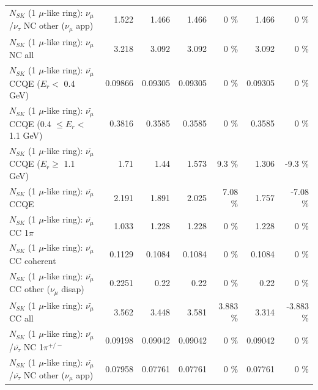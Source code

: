 \begin{table}
\begin{tabular}{| l | r | r | r  r | r  r |}
     $N_{SK}$ (1 $\mu$-like ring): $\nu_\mu$/$\nu_\tau$ NC other ($\nu_\mu$ app) &           1.522 &           1.466 &           1.466 &        0 \%  &           1.466 &        0 \%  \\ 
                                $N_{SK}$ (1 $\mu$-like ring): $\nu_{\mu}$ NC all &           3.218 &           3.092 &           3.092 &        0 \%  &           3.092 &        0 \%  \\ 
\hline
\hline
\hline
          $N_{SK}$ (1 $\mu$-like ring): $\bar{\nu_\mu}$ CCQE ($E_{r} <$ 0.4 GeV) &         0.09866 &         0.09305 &         0.09305 &        0 \%  &         0.09305 &        0 \%  \\ 
 $N_{SK}$ (1 $\mu$-like ring): $\bar{\nu_\mu}$ CCQE (0.4 $\leq E_{r} <$ 1.1 GeV) &          0.3816 &          0.3585 &          0.3585 &        0 \%  &          0.3585 &        0 \%  \\ 
       $N_{SK}$ (1 $\mu$-like ring): $\bar{\nu_\mu}$ CCQE ($E_{r} \geq$ 1.1 GeV) &            1.71 &            1.44 &           1.573 &      9.3 \%  &           1.306 &     -9.3 \%  \\ 
\hline
                              $N_{SK}$ (1 $\mu$-like ring): $\bar{\nu_\mu}$ CCQE &           2.191 &           1.891 &           2.025 &     7.08 \%  &           1.757 &    -7.08 \%  \\ 
                         $N_{SK}$ (1 $\mu$-like ring): $\bar{\nu_\mu}$ CC 1$\pi$ &           1.033 &           1.228 &           1.228 &        0 \%  &           1.228 &        0 \%  \\ 
                       $N_{SK}$ (1 $\mu$-like ring): $\bar{\nu_\mu}$ CC coherent &          0.1129 &          0.1084 &          0.1084 &        0 \%  &          0.1084 &        0 \%  \\ 
        $N_{SK}$ (1 $\mu$-like ring): $\bar{\nu_\mu}$ CC other ($\nu_\mu$ disap) &          0.2251 &            0.22 &            0.22 &        0 \%  &            0.22 &        0 \%  \\ 
                          $N_{SK}$ (1 $\mu$-like ring): $\bar{\nu_{\mu}}$ CC all &           3.562 &           3.448 &           3.581 &    3.883 \%  &           3.314 &   -3.883 \%  \\ 
\hline
  $N_{SK}$ (1 $\mu$-like ring): $\bar{\nu_\mu}$/$\bar{\nu_\tau}$ NC 1$\pi^{+/-}$ &         0.09198 &         0.09042 &         0.09042 &        0 \%  &         0.09042 &        0 \%  \\ 
$N_{SK}$ (1 $\mu$-like ring): $\bar{\nu_\mu}$/$\bar{\nu_\tau}$ NC other ($\nu_\mu$ app) &         0.07958 &         0.07761 &         0.07761 &        0 \%  &         0.07761 &        0 \%  \\ 

\end{tabular}
\end{table}

